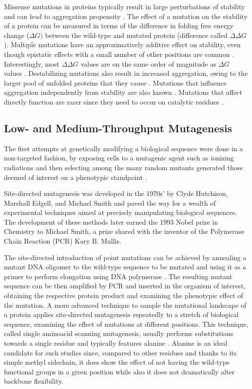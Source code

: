Missense mutations in proteins typically result in large perturbations of stability and can lead to aggregation propensity \parencite{DePristo2005}.
The effect of a mutation on the stability of a protein can be measured in terms of the difference in folding free energy change ($\Delta G)$ between the wild-type and mutated protein (difference called $\Delta\Delta G$).
Multiple mutations have an approximatively additive effect on stability, even though epistatic effects with a small number of other positions are common \parencite{Daopin1991, Green1993}.
Interestingly, most $\Delta\Delta G$ values are on the same order of magnitude as $\Delta G$ values \parencite{DePristo2005}.
Destabilizing mutations also result in increased aggregation, owing to the larger pool of unfolded proteins that they cause \parencite{Chiti2000,RamirezAlvarado2000}.
Mutations that influence aggregation independently from stability are also known \parencite{Mitraki1991,Pawar2005}.
Mutations that affect directly function are rarer since they need to occur on catalytic residues \parencite{DePristo2005}.


\subsection{Low- and Medium-Throughput Mutagenesis}
The first attempts at genetically modifying a biological sequence were done in a non-targeted fashion, by exposing cells to a mutagenic agent such as ionizing radiations and then selecting among the many random mutants generated those deemed of interest on a phenotypic standpoint \parencite{Muller1927, Stadler1928}.

Site-directed mutagenesis \parencite[reviewed in][]{Shortle1981} was developed in the 1970s' by Clyde Hutchison, Marshall Edgell, and Michael Smith and paved the way for a wealth of experimental techniques aimed at precisely manipulating biological sequences.
The development of these methods later earned the 1993 Nobel prize in Chemistry to Michael Smith, a prize shared with the inventor of the Polymerase Chain Reaction (PCR) Kary B. Mullis.

The site-directed introduction of point mutations can be achieved by annealing a mutant DNA oligomer to the wild-type sequence to be mutated and using it as a primer to perform elongation using DNA polymerase \parencite{Hutchison1978}.
The resulting mutant sequence can be then amplified by PCR and inserted in the organism of interest, obtaining the respective protein product and examining the phenotypic effect of the mutation.
A more advanced technique to sample the mutational landscape of a protein applies site-directed mutagenesis repeatedly to a stretch of biological sequence, examining the effect of mutations at different positions.
This technique, called single aminoacid scanning mutagenesis, usually performs substitutions towards a single residue and typically features alanine \parencite[reviewed in][]{Morrison2001}.
Alanine is an ideal candidate for such studies since, compared to other residues and thanks to its simple methyl sidechain, it does show the effect of not having the wild-type functional groups in a given position while also it does not dramatically alter backbone flexibility.

